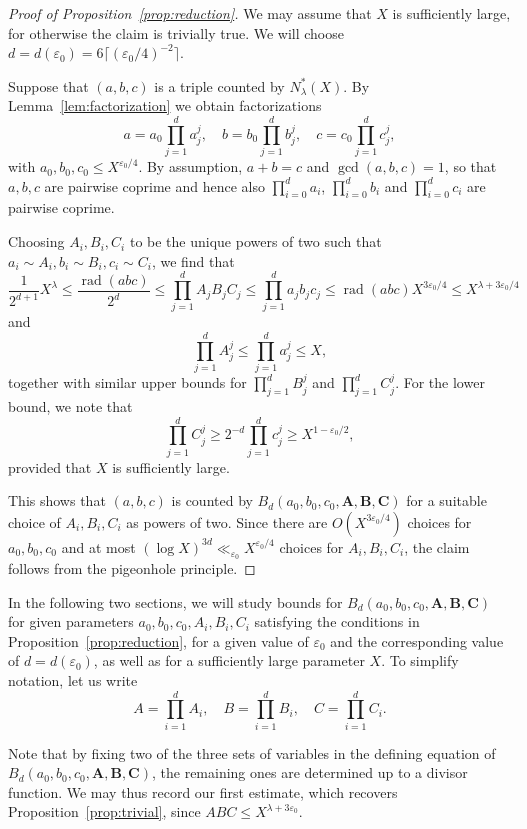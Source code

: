 \documentclass[a4paper,11pt,twoside,reqno]{amsart}
\def\Ab{\mathbf{A}}
\def\Bb{\mathbf{B}}
\def\Cb{\mathbf{C}}
\renewcommand{\leq}{\leqslant}
\renewcommand{\le}{\leqslant}
\renewcommand{\ge}{\geqslant}
\newcommand\ve{\varepsilon}
\theoremstyle{plain}
\theoremstyle{remark}
\DeclareMathOperator\rad{rad}
\numberwithin{prop}{section}
\numberwithin{equation}{section}
\begin{document}
\begin{proof}[Proof of Proposition~\ref{prop:reduction}]
    We may assume that $X$ is sufficiently large, for otherwise the claim is trivially true. We will choose $d=d(\varepsilon_0)=6\lceil (\varepsilon_0/4)^{-2}\rceil$.
    
    Suppose that $(a,b,c)$ is a triple counted by $N_{\lambda}^*(X)$. By Lemma~\ref{lem:factorization} we obtain factorizations
    \[
    a=a_0 \prod_{j=1}^d a_j^j, \quad b=b_0 \prod_{j=1}^d b_j^j, \quad c=c_0 \prod_{j=1}^d c_j^j,
    \]
    with $a_0,b_0,c_0 \le X^{\varepsilon_0/4}$. By assumption, $a+b=c$ and $\gcd(a,b,c)=1$, so that $a,b,c$ are pairwise coprime and hence also $\prod_{i=0}^d a_i$, $\prod_{i=0}^d b_i$ and $\prod_{i=0}^d c_i$ are pairwise coprime.

    Choosing $A_i,B_i,C_i$ to be the unique powers of two such that $a_i \sim A_i, b_i \sim B_i, c_i \sim C_i$, we find that
    \[
\frac{1}{2^{d+1}}X^\lambda \leq     \frac{\rad(abc)}{2^d}
\leq     \prod_{j=1}^d A_jB_jC_j \le \prod_{j=1}^d a_jb_jc_j \le \rad(abc)X^{3\varepsilon_0/4}  \le X^{\lambda+3\varepsilon_0/4}
    \]
and
    \[\prod_{j=1}^d A_j^j \le \prod_{j=1}^d a_j^j \le X,\]
together with similar upper bounds for $\prod_{j=1}^d B_j^j$ and $\prod_{j=1}^d C_j^j$. 
For the lower bound, we note that 
    \[\prod_{j=1}^d C_j^j \ge 2^{-d} \prod_{j=1}^d c_j^j \ge X^{1-\varepsilon_0/2},\]
    provided that $X$ is sufficiently large.

    This shows that $(a,b,c)$ is counted by $B_d(a_0,b_0,c_0,\Ab,\Bb,\Cb)$ for a suitable  choice of $A_i,B_i,C_i$ as powers of two. Since there
    are $O(X^{3\ve_0/4})$ choices for $a_0,b_0,c_0$ and at most $(\log X)^{3d} \ll_{\varepsilon_0} X^{\varepsilon_0/4}$ 
    choices for $A_i,B_i,C_i$,  the claim  follows from the pigeonhole principle.    
\end{proof}

In the following two sections, we will study bounds for $B_d(a_0,b_0,c_0,\Ab,\Bb,\Cb)$ for given parameters $a_0,b_0,c_0,A_i,B_i,C_i$ satisfying the conditions in Proposition~\ref{prop:reduction}, for a given value of $\varepsilon_0$ and the corresponding value of $d=d(\varepsilon_0)$, as well as for a  sufficiently large parameter $X$.
To simplify notation, let us write 
$$
A=\prod_{i=1}^d A_i, \quad B=\prod_{i=1}^d B_i, \quad  C=\prod_{i=1}^d C_i.
$$

Note that by fixing two of the three sets of variables in the defining equation of 
$B_d(a_0,b_0,c_0,\Ab,\Bb,\Cb)$,
the remaining ones are determined up to a divisor function. We may thus record our first estimate, which 
recovers Proposition~\ref{prop:trivial}, since  $ABC \le X^{\lambda+3\varepsilon_0}$.
\end{document}
